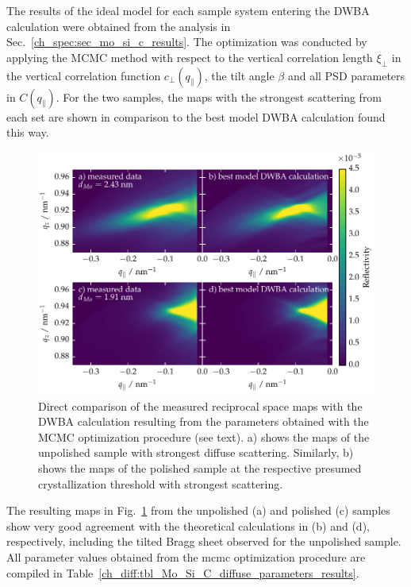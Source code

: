 The results of the ideal model for each sample system entering the DWBA calculation were obtained from the analysis in Sec.~\ref{ch_spec:sec_mo_si_c_results}. The optimization was conducted by applying the MCMC method with respect to the vertical correlation length $\xi_\perp$ in the vertical correlation function $c_\perp(q_\parallel)$, the tilt angle $\beta$ and all PSD parameters in $C(q_\parallel)$. For the two samples, the maps with the strongest scattering from each set are shown in comparison to the best model DWBA calculation found this way. 
\begin{figure}[htbp]
\centering
\includegraphics[width=\textwidth]{img/MoSiC_dwba_data_best_model_comparison}
\caption[Direct comparison of the measured and calculated reciprocal space maps.]{Direct comparison of the measured reciprocal space maps with the DWBA calculation resulting from the parameters obtained with the MCMC optimization procedure (see text). a) shows the maps of the unpolished sample with strongest diffuse scattering. Similarly, b) shows the maps of the polished sample at the respective presumed crystallization threshold with strongest scattering.}
\label{fig:dwba_data_best_model_comparison}
\end{figure}
The resulting maps in Fig.~\ref{fig:dwba_data_best_model_comparison} from the unpolished (a) and polished (c) samples show very good agreement with the theoretical calculations in (b) and (d), respectively, including the tilted Bragg sheet observed for the unpolished sample. All parameter values obtained from the \gls{mcmc} optimization procedure are compiled in Table~\ref{ch_diff:tbl_Mo_Si_C_diffuse_parameters_results}. 

